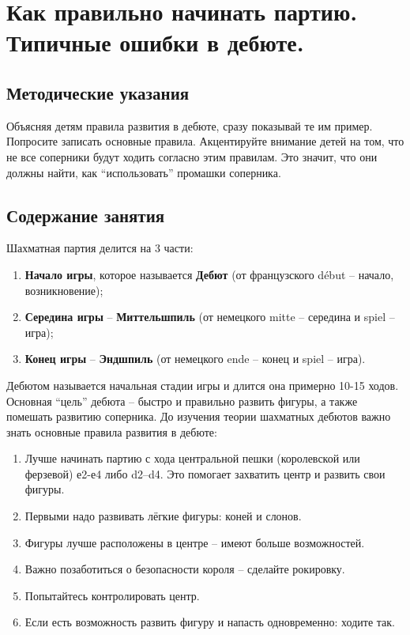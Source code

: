 \chapter{Как правильно начинать партию. Типичные ошибки в дебюте.}

\section{Методические указания}

Объясняя детям правила развития в дебюте, сразу показывай те им пример. Попросите записать основные правила. Акцентируйте внимание детей на том, что не все соперники будут ходить согласно этим правилам. Это значит, что они должны найти, как ``использовать'' промашки соперника.

\section{Содержание занятия}

Шахматная партия делится на 3 части: 

\begin{enumerate}
\item \textbf{Начало игры}, которое называется \textbf{Дебют} (от французского début -- начало, возникновение);
\item \textbf{Середина игры} -- \textbf{Миттельшпиль} (от немецкого mitte -- середина и spiel -- игра);
\item \textbf{Конец игры} -- \textbf{Эндшпиль} (от немецкого ende -- конец и spiel -- игра).
\end{enumerate}

Дебютом называется начальная стадии игры и длится она примерно 10-15 ходов. Основная ``цель'' дебюта -- быстро и правильно развить фигуры, а также помешать развитию соперника. До изучения теории шахматных дебютов важно знать основные правила развития в дебюте:

\begin{enumerate}
\item Лучше начинать партию с хода центральной пешки (королевской или ферзевой) е2-е4 либо d2–d4. Это помогает захватить центр и развить свои фигуры.
\item Первыми надо развивать лёгкие фигуры: коней и слонов.
\item Фигуры лучше расположены в центре -- имеют больше возможностей.
\item Важно позаботиться о безопасности короля -- сделайте рокировку.
\item Попытайтесь контролировать центр.
\item Если есть возможность развить фигуру и напасть одновременно: ходите так.
\end{enumerate}

